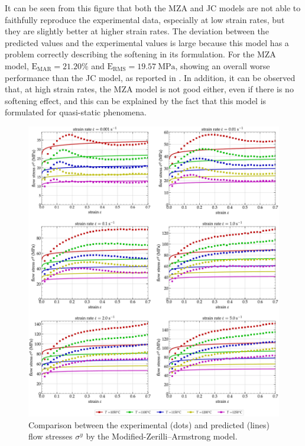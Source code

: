 \documentclass[metals,article,accept,pdftex,moreauthors]{Definitions/mdpi}
\DeclareRobustCommand{\RMSE}{\text{E}_\text{RMS}}
\DeclareRobustCommand{\MARE}{\text{E}_\text{MAR}}
\DeclareRobustCommand{\MPa}{\text{MPa}}
\begin{document}
It can be seen from this figure that both the MZA and JC models are not able to faithfully reproduce the experimental data, especially at low strain rates, but they are slightly better at higher strain rates.
The deviation between the predicted values and the experimental values is large because this model has a problem correctly describing the softening in its formulation.
For the MZA model, $\MARE=21.20\%$ and $\RMSE=19.57~\MPa$, showing an overall worse performance than the JC model, as reported in \cite{TizeMha-2022}.
In addition, it can be observed that, at high strain rates, the MZA model is not good either, even if there is no softening effect, and this can be explained by the fact that this model is formulated for quasi-static phenomena.


\begin{figure}[H]
\includegraphics[width=0.93\columnwidth]
{Figures/CompExp-MZA-6}
\caption{Comparison between the experimental (dots) and predicted (lines) flow stresses $\sigma^y$ by the Modified-Zerilli--Armstrong model.}
\label{fig:CompExp-MZA-6}
\end{figure}


\vspace{-10pt}
\end{document}
